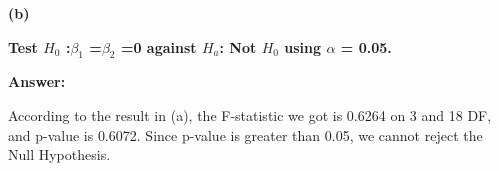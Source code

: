 \documentclass[letterpaper,11pt]{article}
\begin{document}
\bigbreak
\begin{addmargin}[-1.1em]{0em}
\textbf{(b)}\par\end{addmargin}
\textbf{Test $H_0$ :$\beta_1$ =$\beta_2$ =0 against $H_a$: Not $H_0$ using $\alpha$ = 0.05.}\par
\bigbreak
\begin{addmargin}[-0.5em]{0em}
\textbf{Answer: }\end{addmargin}

According to the result in (a), the F-statistic we got is 0.6264 on 3 and 18 DF, and p-value is 0.6072. Since p-value is greater than 0.05, we cannot reject the Null Hypothesis.
\bigbreak
\end{document}
